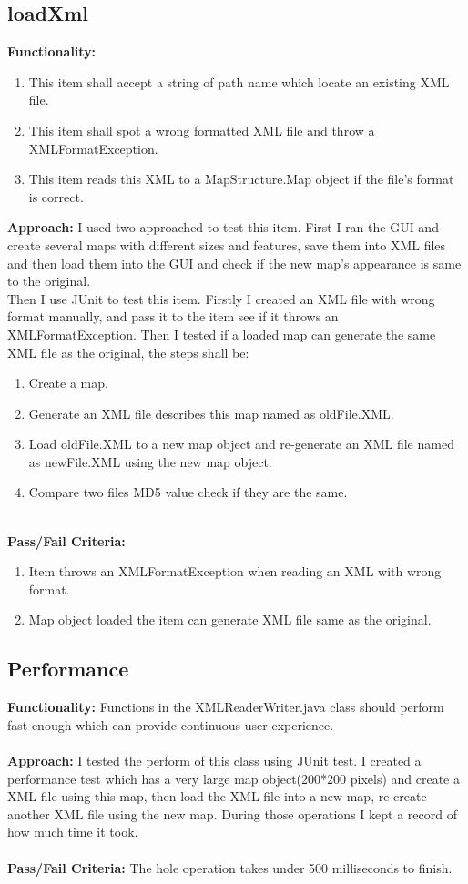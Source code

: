 \documentclass[12pt, a4paper]{report}
\begin{document}
\subsection{loadXml}
\textbf{Functionality:}
\begin{enumerate}
	\item This item shall accept a string of path name which locate an existing XML file.
	\item This item shall spot a wrong formatted XML file and throw a XMLFormatException.
	\item This item reads this XML to a MapStructure.Map object if the file's format is correct.
\end{enumerate}
\textbf{Approach:}
I used two approached to test this item. First I ran the GUI and create several maps with different sizes and features, save them into XML files and then load them into the GUI and check if the new map's appearance is same to the original.\\
Then I use JUnit to test this item. Firstly I created an XML file with wrong format manually, and pass it to the item see if it throws an XMLFormatException. Then I tested if a loaded map can generate the same XML file as the original, the steps shall be:
\begin{enumerate}
	\item Create a map.
	\item Generate an XML file describes this map named as oldFile.XML.
	\item Load oldFile.XML to a new map object and re-generate an XML file named as newFile.XML using the new map object.
	\item Compare two files MD5 value check if they are the same.
\end{enumerate}
\textbf{\\Pass/Fail Criteria: }
\begin{enumerate}
	\item Item throws an XMLFormatException when reading an XML with wrong format.
	\item Map object loaded the item can generate XML file same as the original.\\
\end{enumerate}

\subsection{Performance}
\textbf{Functionality:}
Functions in the XMLReaderWriter.java class should perform fast enough which can provide continuous user experience.\\
\textbf{\\Approach:}
I tested the perform of this class using JUnit test. I created a performance test which has a very large map object(200*200 pixels) and create a XML file using this map, then load the XML file into a new map, re-create another XML file using the new map. During those operations I kept a record of how much time it took.\\
\textbf{\\Pass/Fail Criteria: }
The hole operation takes under 500 milliseconds to finish.\\
\end{document}
